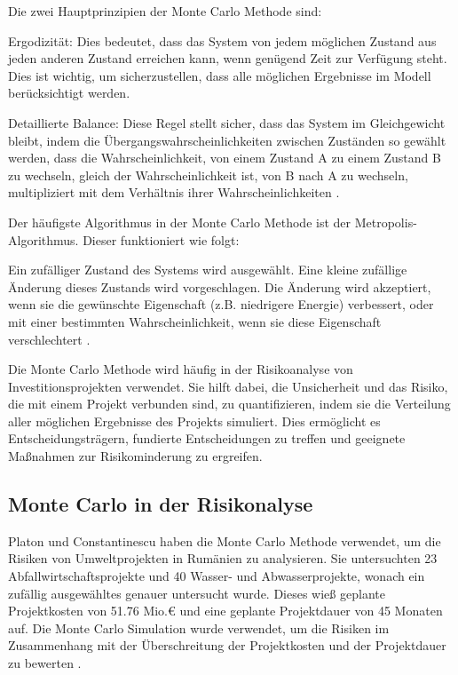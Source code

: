 Die zwei Hauptprinzipien der Monte Carlo Methode sind:

Ergodizität: Dies bedeutet, dass das System von jedem möglichen Zustand aus jeden anderen Zustand erreichen kann, wenn 
genügend Zeit zur Verfügung steht. Dies ist wichtig, um sicherzustellen, dass alle möglichen Ergebnisse im Modell berücksichtigt 
werden.

Detaillierte Balance: Diese Regel stellt sicher, dass das System im Gleichgewicht bleibt, indem die Übergangswahrscheinlichkeiten 
zwischen Zuständen so gewählt werden, dass die Wahrscheinlichkeit, von einem Zustand A zu einem Zustand B zu wechseln, gleich der 
Wahrscheinlichkeit ist, von B nach A zu wechseln, multipliziert mit dem Verhältnis ihrer Wahrscheinlichkeiten \cite{Walter2014}.

Der häufigste Algorithmus in der Monte Carlo Methode ist der Metropolis-Algorithmus. Dieser funktioniert wie folgt:

Ein zufälliger Zustand des Systems wird ausgewählt.
Eine kleine zufällige Änderung dieses Zustands wird vorgeschlagen.
Die Änderung wird akzeptiert, wenn sie die gewünschte Eigenschaft (z.B. niedrigere Energie) verbessert, oder mit einer 
bestimmten Wahrscheinlichkeit, wenn sie diese Eigenschaft verschlechtert \cite{Walter2014}.

Die Monte Carlo Methode wird häufig in der Risikoanalyse von Investitionsprojekten verwendet. Sie hilft dabei, die Unsicherheit und 
das Risiko, die mit einem Projekt verbunden sind, zu quantifizieren, indem sie die Verteilung aller möglichen Ergebnisse des Projekts 
simuliert. Dies ermöglicht es Entscheidungsträgern, fundierte Entscheidungen zu treffen und geeignete Maßnahmen zur Risikominderung zu 
ergreifen.

\subsection{Monte Carlo in der Risikonalyse}

Platon und Constantinescu haben die Monte Carlo Methode verwendet, um die Risiken von Umweltprojekten in Rumänien zu analysieren. 
Sie untersuchten 23 Abfallwirtschaftsprojekte und 40 Wasser- und Abwasserprojekte, wonach ein zufällig ausgewähltes genauer untersucht 
wurde. Dieses wieß geplante Projektkosten von 51.76 Mio.€ und eine geplante Projektdauer von 45 Monaten auf.
Die Monte Carlo Simulation wurde verwendet, um die Risiken im Zusammenhang mit der Überschreitung der Projektkosten und 
der Projektdauer zu bewerten \cite{Platon2014}.

